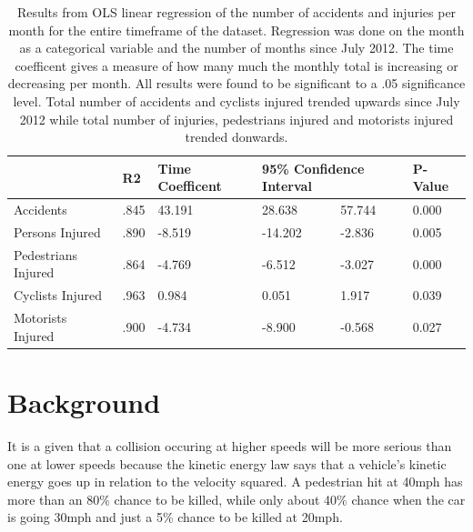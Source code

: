 \documentclass[10pt,journal,compsoc]{IEEEtran}
\begin{document}
\begin{table}[]
\centering
\caption{Results from OLS linear regression of the number of accidents and injuries per month for the entire timeframe of the dataset.  Regression was done on the month as a categorical variable and the number of months since July 2012.  The time coefficent gives a measure of how many much the monthly total is increasing or decreasing per month.  All results were found to be significant to a .05 significance level.  Total number of accidents and cyclists injured trended upwards since July 2012 while total number of injuries, pedestrians injured and motorists injured trended donwards. }
\label{tab:timeline}
\begin{tabular}{|l|l|l|l|l|l|}
\hline
                    & R2   & Time Coefficent & \multicolumn{2}{l|}{95\% Confidence Interval} & P-Value \\ \hline
Accidents           & .845 & 43.191          & 28.638                 & 57.744               & 0.000   \\ \hline
Persons Injured     & .890 & -8.519          & -14.202                & -2.836               & 0.005   \\ \hline
Pedestrians Injured & .864 & -4.769          & -6.512                 & -3.027               & 0.000   \\ \hline
Cyclists Injured    & .963 & 0.984           & 0.051                  & 1.917                & 0.039   \\ \hline
Motorists Injured   & .900 & -4.734          & -8.900                 & -0.568               & 0.027   \\ \hline
\end{tabular}
\end{table}


\section{Background}

It is a given that a collision occuring at higher speeds will be more serious than one at lower speeds because the kinetic energy law says that a vehicle's kinetic energy goes up in relation to the velocity squared. A pedestrian hit at 40mph has more than an 80\% chance to be killed, while only about 40\% chance when the car is going 30mph and just a 5\% chance to be killed at 20mph\cite{fatalityrates}.
\end{document}
